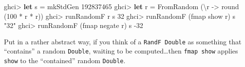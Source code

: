 \documentclass[]{article}
\newenvironment{Shaded}{}{}
\newcommand{\KeywordTok}[1]{\textcolor[rgb]{0.00,0.44,0.13}{\textbf{{#1}}}}
\newcommand{\DataTypeTok}[1]{\textcolor[rgb]{0.56,0.13,0.00}{{#1}}}
\newcommand{\DecValTok}[1]{\textcolor[rgb]{0.25,0.63,0.44}{{#1}}}
\newcommand{\StringTok}[1]{\textcolor[rgb]{0.25,0.44,0.63}{{#1}}}
\newcommand{\OtherTok}[1]{\textcolor[rgb]{0.00,0.44,0.13}{{#1}}}
\newcommand{\FunctionTok}[1]{\textcolor[rgb]{0.02,0.16,0.49}{{#1}}}
\newcommand{\NormalTok}[1]{{#1}}
\begin{document}
\begin{Shaded}
\begin{Highlighting}[]
\NormalTok{ghci}\FunctionTok{>} \KeywordTok{let} \NormalTok{s }\FunctionTok{=} \NormalTok{mkStdGen }\DecValTok{192837465}
\NormalTok{ghci}\FunctionTok{>} \KeywordTok{let} \NormalTok{r }\FunctionTok{=} \DataTypeTok{FromRandom} \NormalTok{(\textbackslash{}r }\OtherTok{->} \NormalTok{round (}\DecValTok{100} \FunctionTok{*} \NormalTok{r }\FunctionTok{*} \NormalTok{r))}
\NormalTok{ghci}\FunctionTok{>} \NormalTok{runRandomF r s}
\DecValTok{32}
\NormalTok{ghci}\FunctionTok{>} \NormalTok{runRandomF (fmap show r) s}
\StringTok{"32"}
\NormalTok{ghci}\FunctionTok{>} \NormalTok{runRandomF (fmap negate r) s}
\FunctionTok{-}\DecValTok{32}
\end{Highlighting}
\end{Shaded}

Put in a rather abstract way, if you think of a \texttt{RandF\ Double} as
something that ``contains'' a random \texttt{Double}, waiting to be
computed\ldots{}then \texttt{fmap\ show} applies \texttt{show} to the
``contained'' random \texttt{Double}.
\end{document}
